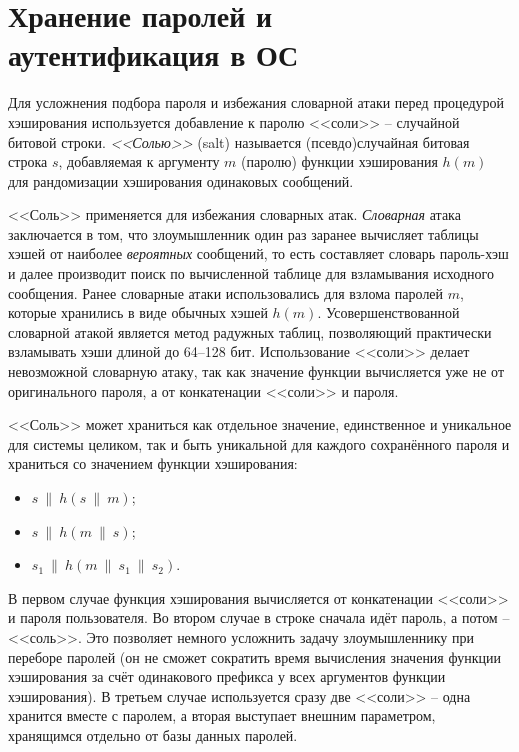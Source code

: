 \section[Пароли и аутентификация в ОС]{Хранение паролей и \protect\\ аутентификация в ОС}

Для усложнения подбора пароля и избежания словарной атаки перед процедурой хэширования используется добавление к паролю <<соли>> -- случайной битовой строки. \emph{<<Солью>>} (salt) называется (псевдо)случайная битовая строка $s$, добавляемая к аргументу $m$ (паролю) функции хэширования $h(m)$ для рандомизации хэширования одинаковых сообщений.

<<Соль>> применяется для избежания словарных атак. \emph{Словарная} атака заключается в том, что злоумышленник один раз заранее вычисляет таблицы хэшей от наиболее \emph{вероятных} сообщений, то есть составляет словарь пароль-хэш и далее производит поиск по вычисленной таблице для взламывания исходного сообщения. Ранее словарные атаки использовались для взлома паролей $m$, которые хранились в виде обычных хэшей $h(m)$. Усовершенствованной словарной атакой является метод радужных таблиц, позволяющий практически взламывать хэши длиной до 64--128 бит. Использование <<соли>> делает невозможной словарную атаку, так как значение функции вычисляется уже не от оригинального пароля, а от конкатенации <<соли>> и пароля.

<<Соль>> может храниться как отдельное значение, единственное и уникальное для системы целиком, так и быть уникальной для каждого сохранённого пароля и храниться со значением функции хэширования:
\begin{itemize}
	\item $s ~\|~ h(s ~\|~ m)$;
	\item $s ~\|~ h(m ~\|~ s)$;
	\item $s_1 ~\|~ h(m ~\|~ s_1 ~\|~ s_2)$.
\end{itemize}

В первом случае функция хэширования вычисляется от конкатенации <<соли>> и пароля пользователя. Во втором случае в строке сначала идёт пароль, а потом -- <<соль>>. Это позволяет немного усложнить задачу злоумышленнику при переборе паролей (он не сможет сократить время вычисления значения функции хэширования за счёт одинакового префикса у всех аргументов функции хэширования). В третьем случае используется сразу две <<соли>> -- одна хранится вместе с паролем, а вторая выступает внешним параметром, хранящимся отдельно от базы данных паролей.

